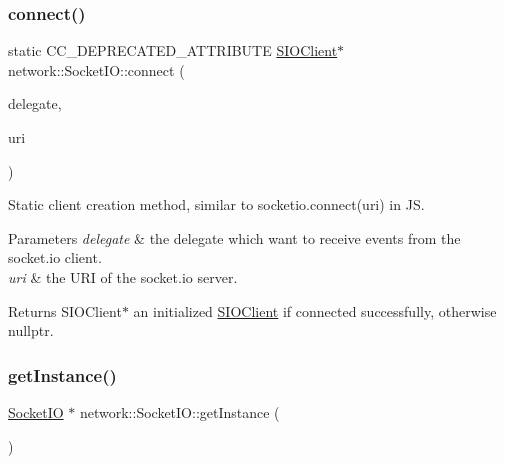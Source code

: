 \subsubsection{\texorpdfstring{connect()}{connect()}\hspace{0.1cm}{\footnotesize\ttfamily [5/5]}}
{\footnotesize\ttfamily static C\+C\+\_\+\+D\+E\+P\+R\+E\+C\+A\+T\+E\+D\+\_\+\+A\+T\+T\+R\+I\+B\+U\+TE \hyperlink{classnetwork_1_1SIOClient}{S\+I\+O\+Client}$\ast$ network\+::\+Socket\+I\+O\+::connect (\begin{DoxyParamCaption}\item[{\hyperlink{classnetwork_1_1SocketIO_1_1SIODelegate}{Socket\+I\+O\+::\+S\+I\+O\+Delegate} \&}]{delegate,  }\item[{const std\+::string \&}]{uri }\end{DoxyParamCaption})\hspace{0.3cm}{\ttfamily [static]}}

Static client creation method, similar to socketio.\+connect(uri) in JS. 
\begin{DoxyParams}{Parameters}
{\em delegate} & the delegate which want to receive events from the socket.\+io client. \\
\hline
{\em uri} & the U\+RI of the socket.\+io server. \\
\hline
\end{DoxyParams}
\begin{DoxyReturn}{Returns}
S\+I\+O\+Client$\ast$ an initialized \hyperlink{classnetwork_1_1SIOClient}{S\+I\+O\+Client} if connected successfully, otherwise nullptr. 
\end{DoxyReturn}
\mbox{\label{classnetwork_1_1SocketIO_ad8607185ae7acb4a05f9b720bc699b6d}} 
\subsubsection{\texorpdfstring{get\+Instance()}{getInstance()}\hspace{0.1cm}{\footnotesize\ttfamily [1/2]}}
{\footnotesize\ttfamily \hyperlink{classnetwork_1_1SocketIO}{Socket\+IO} $\ast$ network\+::\+Socket\+I\+O\+::get\+Instance (\begin{DoxyParamCaption}{ }\end{DoxyParamCaption})\hspace{0.3cm}{\ttfamily [static]}}

